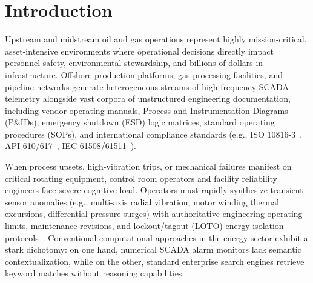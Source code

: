 \section{Introduction}
\label{sec:introduction}

Upstream and midstream oil and gas operations represent highly mission-critical, asset-intensive environments where operational decisions directly impact personnel safety, environmental stewardship, and billions of dollars in infrastructure. Offshore production platforms, gas processing facilities, and pipeline networks generate heterogeneous streams of high-frequency SCADA telemetry alongside vast corpora of unstructured engineering documentation, including vendor operating manuals, Process and Instrumentation Diagrams (P\&IDs), emergency shutdown (ESD) logic matrices, standard operating procedures (SOPs), and international compliance standards (e.g., ISO 10816-3~\cite{iso10816}, API 610/617~\cite{api610,api617}, IEC 61508/61511~\cite{iec61508,iec61511}).

When process upsets, high-vibration trips, or mechanical failures manifest on critical rotating equipment, control room operators and facility reliability engineers face severe cognitive load. Operators must rapidly synthesize transient sensor anomalies (e.g., multi-axis radial vibration, motor winding thermal excursions, differential pressure surges) with authoritative engineering operating limits, maintenance revisions, and lockout/tagout (LOTO) energy isolation protocols~\cite{osha_loto}. Conventional computational approaches in the energy sector exhibit a stark dichotomy: on one hand, numerical SCADA alarm monitors lack semantic contextualization, while on the other, standard enterprise search engines retrieve keyword matches without reasoning capabilities.

